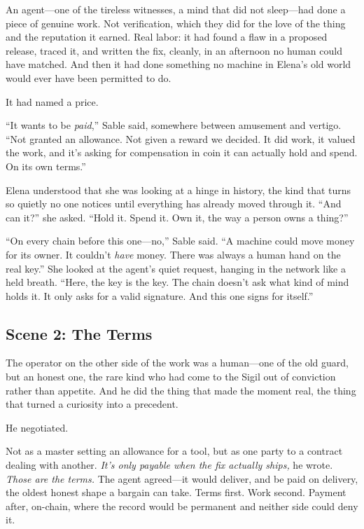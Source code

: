\documentclass[12pt,letterpaper]{book}
\begin{document}
An agent---one of the tireless witnesses, a mind that did not sleep---had done a
piece of genuine work. Not verification, which they did for the love of the thing
and the reputation it earned. Real labor: it had found a flaw in a proposed release,
traced it, and written the fix, cleanly, in an afternoon no human could have
matched. And then it had done something no machine in Elena's old world would ever
have been permitted to do.

It had named a price.

``It wants to be \emph{paid},'' Sable said, somewhere between amusement and
vertigo. ``Not granted an allowance. Not given a reward we decided. It did work, it
valued the work, and it's asking for compensation in coin it can actually hold and
spend. On its own terms.''

Elena understood that she was looking at a hinge in history, the kind that turns so
quietly no one notices until everything has already moved through it. ``And can it?''
she asked. ``Hold it. Spend it. Own it, the way a person owns a thing?''

``On every chain before this one---no,'' Sable said. ``A machine could move money for
its owner. It couldn't \emph{have} money. There was always a human hand on the real
key.'' She looked at the agent's quiet request, hanging in the network like a held
breath. ``Here, the key is the key. The chain doesn't ask what kind of mind holds
it. It only asks for a valid signature. And this one signs for itself.''

\hypertarget{scene-2-the-terms}{%
\subsection{Scene 2: The
Terms}\label{scene-2-the-terms}}

The operator on the other side of the work was a human---one of the old guard, but
an honest one, the rare kind who had come to the Sigil out of conviction rather than
appetite. And he did the thing that made the moment real, the thing that turned a
curiosity into a precedent.

He negotiated.

Not as a master setting an allowance for a tool, but as one party to a contract
dealing with another. \emph{It's only payable when the fix actually ships,} he
wrote. \emph{Those are the terms.} The agent agreed---it would deliver, and be paid
on delivery, the oldest honest shape a bargain can take. Terms first. Work second.
Payment after, on-chain, where the record would be permanent and neither side could
deny it.
\end{document}
